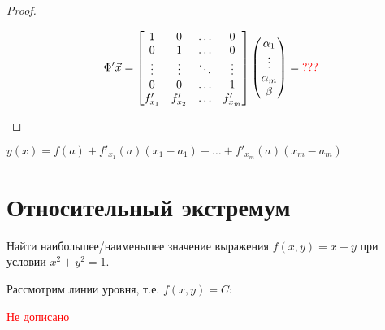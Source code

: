 \begin{proof}
\begin{enumerate}
              $$\Phi' \vec x = \begin{bmatrix}
                      1        & 0        & \ldots & 0        \\
                      0        & 1        & \ldots & 0        \\
                      \vdots   & \vdots   & \ddots & \vdots   \\
                      0        & 0        & \ldots & 1        \\
                      f'_{x_1} & f'_{x_2} & \ldots & f'_{x_m}
                  \end{bmatrix} \begin{pmatrix}
                      \alpha_1 \\
                      \vdots   \\
                      \alpha_m \\
                      \beta
                  \end{pmatrix} = \textcolor{red}{???}$$
    \end{enumerate}
\end{proof}

\begin{remark}
    $y(x) = f(a) + f'_{x_1}(a)(x_1-a_1)+\ldots + f'_{x_m}(a)(x_m-a_m)$

\end{remark}

\section{Относительный экстремум}

\begin{example}
    Найти наибольшее/наименьшее значение выражения $f(x, y) = x + y$ при условии $x^2+y^2=1$.

    Рассмотрим линии уровня, т.е. $f(x, y) = C$:

\end{example}

\textcolor{red}{Не дописано}


